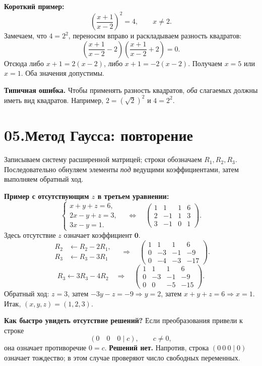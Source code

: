 \documentclass[a4paper,12pt]{article}
\newcommand{\strong}[1]{{\color{darkaccent}\textbf{#1}}}
\begin{document}
\textbf{Короткий пример:}
\[
\left(\frac{x+1}{x-2}\right)^2=4,
\qquad x\ne2.
\]
Замечаем, что $4=2^2$, переносим вправо и раскладываем разность
квадратов:
\[
\left(\frac{x+1}{x-2}-2\right)
\left(\frac{x+1}{x-2}+2\right)=0.
\]
Отсюда либо $x+1=2(x-2)$, либо $x+1=-2(x-2)$.
Получаем $x=5$ или $x=1$. Оба значения допустимы.

\strong{Типичная ошибка.} Чтобы применять разность квадратов,
\emph{оба} слагаемых должны иметь вид квадратов. Например,
$2=(\sqrt2)^2$ и $4=2^2$.

\clearpage
\section*{\color{darkaccent}05.\quad Метод Гаусса: повторение}
Записываем систему расширенной матрицей; строки обозначаем $R_1,R_2,R_3$.
Последовательно обнуляем элементы \emph{под} ведущими коэффициентами,
затем выполняем обратный ход.

\textbf{Пример с отсутствующим $z$ в третьем уравнении:}
\[
\begin{cases}
x+y+z=6,\\
2x-y+z=3,\\
3x-y=1.
\end{cases}
\quad\Longleftrightarrow\quad
\left(\begin{array}{rrr|r}
1&1&1&6\\2&-1&1&3\\3&-1&0&1
\end{array}\right).
\]
Здесь отсутствие $z$ означает коэффициент $\mathbf{0}$.
\[
\begin{aligned}
R_2&\leftarrow R_2-2R_1,\\
R_3&\leftarrow R_3-3R_1
\end{aligned}
\quad\Longrightarrow\quad
\left(\begin{array}{rrr|r}
1&1&1&6\\0&-3&-1&-9\\0&-4&-3&-17
\end{array}\right).
\]
\[
R_3\leftarrow 3R_3-4R_2
\quad\Longrightarrow\quad
\left(\begin{array}{rrr|r}
1&1&1&6\\0&-3&-1&-9\\0&0&-5&-15
\end{array}\right).
\]
Обратный ход: $z=3$, затем $-3y-z=-9\Rightarrow y=2$,
затем $x+y+z=6\Rightarrow x=1$.
Итак, $(x,y,z)=(1,2,3)$.

\strong{Как быстро увидеть отсутствие решений?}
Если преобразования привели к строке
\[
(0\quad 0\quad 0\mid c),\qquad c\ne0,
\]
она означает противоречие $0=c$. \textbf{Решений нет.}
Напротив, строка $(0\ 0\ 0\mid0)$ означает тождество;
в этом случае проверяют число свободных переменных.
\end{document}
